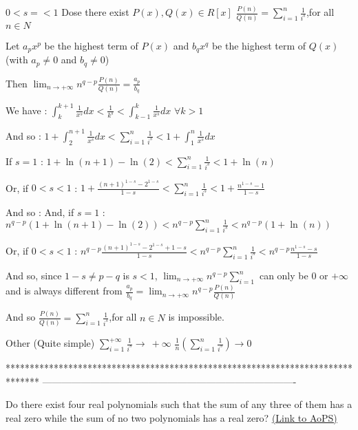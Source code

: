 \begin{solution}
	\begin{tcolorbox}$ 0 < s = < 1$
Dose there exist $ P(x),Q(x)\in R[x]$
$ \frac{P(n)}{Q(n)}=\sum_{i = 1}^{n}\frac{1}{i^{s}}$,for all $ n\in N$\end{tcolorbox}

Let $ a_{p}x^{p}$ be the highest term of $ P(x)$ and $ b_{q}x^{q}$ be the highest term of $ Q(x)$ (with $ a_{p}\neq 0$ and $ b_{q}\neq 0$)

Then $ \lim_{n\to+\infty}n^{q-p}\frac{P(n)}{Q(n)}=\frac{a_{p}}{b_{q}}$


We have : $ \int_{k}^{k+1}\frac{1}{x^{s}}dx<\frac{1}{k^{s}}<\int_{k-1}^{k}\frac{1}{x^{s}}dx$ $ \forall k>1$

And so : $ 1+\int_{2}^{n+1}\frac{1}{x^{s}}dx<\sum_{i = 1}^{n}\frac{1}{i^{s}}<1+\int_{1}^{n}\frac{1}{x^{s}}dx$

If $ s=1$ : $ 1+\ln(n+1)-\ln(2)<\sum_{i = 1}^{n}\frac{1}{i^{s}}<1+\ln(n)$

Or, if $ 0<s<1$ : $ 1+\frac{(n+1)^{1-s}-2^{1-s}}{1-s}<\sum_{i = 1}^{n}\frac{1}{i^{s}}<1+\frac{n^{1-s}-1}{1-s}$

And so :
And, if $ s=1$ : $ n^{q-p}(1+\ln(n+1)-\ln(2))<n^{q-p}\sum_{i = 1}^{n}\frac{1}{i^{s}}<n^{q-p}(1+\ln(n))$

Or, if $ 0<s<1$ : $ n^{q-p}\frac{(n+1)^{1-s}-2^{1-s}+1-s}{1-s}<n^{q-p}\sum_{i = 1}^{n}\frac{1}{i^{s}}<n^{q-p}\frac{n^{1-s}-s}{1-s}$

And so, since $ 1-s\neq p-q$ is $ s<1$, $ \lim_{n\to+\infty}n^{q-p}\sum_{i = 1}^{n}$ can only be $ 0$ or $ +\infty$ and is always different from $ \frac{a_{p}}{b_{q}}=\lim_{n\to+\infty}n^{q-p}\frac{P(n)}{Q(n)}$

And so $ \frac{P(n)}{Q(n)}=\sum_{i = 1}^{n}\frac{1}{i^{s}}$,for all $ n\in N$ is impossible.
\end{solution}



\begin{solution}
	Other (Quite simple)
$ \sum_{i = 1}^{+\infty}\frac{1}{i^{s}}\to\ +\infty$
$ \frac{1}{n}(\sum_{i = 1}^{n}\frac{1}{i^{s}})\to 0$
\end{solution}
*******************************************************************************
-------------------------------------------------------------------------------

\begin{problem}
	Do there exist four real polynomials such that the sum of any three of them has a real zero while the sum of no two polynomials has a real zero?
	\flushright \href{https://artofproblemsolving.com/community/c6h166926}{(Link to AoPS)}
\end{problem}



